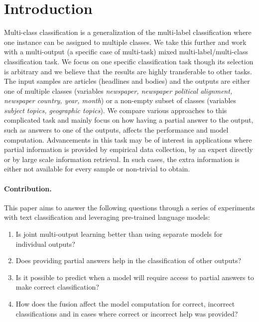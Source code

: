 \section{Introduction}

Multi-class classification is a generalization of the multi-label classification where one instance can be assigned to multiple classes.
We take this further and work with a multi-output (a specific case of multi-task) mixed multi-label/multi-class classification task.
We focus on one specific classification task though its selection is arbitrary and we believe that the results are highly transferable to other tasks.
The input samples are articles (headlines and bodies) and the outputs are either one of multiple classes (variables \emph{newspaper, newspaper political alignment, newspaper country, year, month}) or a non-empty subset of classes (variables \emph{subject topics, geographic topics}).
We compare various approaches to this complicated task and mainly focus on how having a partial answer to the output, such as answers to one of the outputs, affects the performance and model computation.
Advancements in this task may be of interest in applications where partial information is provided by empirical data collection, by an expert directly or by large scale information retrieval.
In such cases, the extra information is either not available for every sample or non-trivial to obtain.

\paragraph{Contribution.}
This paper aims to answer the following questions through a series of experiments with text classification and leveraging pre-trained language models:
\begin{enumerate}[left=0.4cm,itemsep=0cm]
\item Is joint multi-output learning better than using separate models for individual outputs?
\item Does providing partial answers help in the classification of other outputs?
\item Is it possible to predict when a model will require access to partial answers to make correct classification? 
\item How does the fusion affect the model computation for correct, incorrect classifications and in cases where correct or incorrect help was provided?
\end{enumerate}


